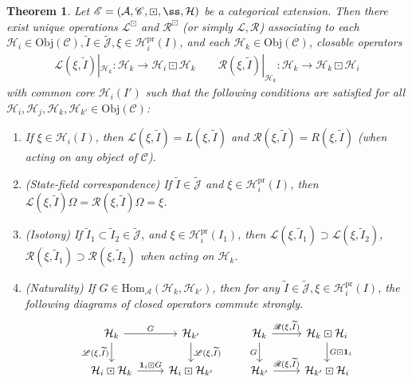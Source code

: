 \documentclass[11pt,b5paper,notitlepage]{article}
\theoremstyle{definition}
\theoremstyle{plain}
\newtheorem{thm}[df]{Theorem}
\newcommand{\mc}{\mathcal}
\newcommand{\wtd}{\widetilde}
\newcommand{\idt}{\mathbf{1}}
\newcommand{\Hom}{\mathrm{Hom}}
\newcommand{\scr}{\mathscr}
\newcommand{\Jtd}{\widetilde{\mathcal J}}
\newcommand{\pr}{\mathrm {pr}}
\newcommand{\Obj}{\mathrm{Obj}}
\numberwithin{equation}{section}
\begin{document}
\begin{thm}\label{lb7}
Let $\scr E=(\mc A,\scr C,\boxdot,\ss,\mc H)$ be a categorical extension. Then there exist unique operations $\scr L^\boxdot$ and $\scr R^\boxdot$ (or simply $\scr L,\scr R$) associating to each $\mc H_i\in\Obj(\scr C),\wtd I\in\Jtd,\xi\in\mc H_i^\pr(I)$, and each $\mc H_k\in\Obj(\scr C)$, closable operators
\begin{gather*}
\scr L(\xi,\wtd I)|_{\mc H_k}:\mc H_k\rightarrow\mc H_i\boxdot\mc H_k \qquad \scr R(\xi,\wtd I)|_{\mc H_k}:\mc H_k\rightarrow\mc H_k\boxdot\mc H_i
\end{gather*}
with common core $\mc H_i(I')$ such that the following conditions are satisfied for all $\mc H_i,\mc H_j,\mc H_k,\mc H_{k'}\in\Obj(\scr C)$:
\begin{enumerate}[label=(\alph*)]
\item If $\xi\in\mc H_i(I)$, then $\scr L(\xi,\wtd I)=L(\xi,\wtd I)$ and $\scr R(\xi,\wtd I)=R(\xi,\wtd I)$ (when acting on any object of $\scr C$).
\item (State-field correspondence) If $\wtd I\in\Jtd$ and $\xi\in\mc H_i^\pr(I)$, then $\scr L(\xi,\wtd I)\Omega=\scr R(\xi,\wtd I)\Omega=\xi$.
\item (Isotony)  If $\wtd I_1\subset\wtd I_2\in\Jtd$, and $\xi\in\mc H_i^\pr(I_1)$, then $\scr L(\xi,\wtd I_1)\supset \scr L(\xi,\wtd I_2)$, $\scr R(\xi,\wtd I_1)\supset \scr R(\xi,\wtd I_2)$ when acting on   $\mc H_k$.
	
\item (Naturality) If $G\in\Hom_{\mc A}(\mc H_k,\mc H_{k'})$, then for any $\wtd I\in\Jtd,\xi\in\mc H_i^\pr(I)$, the following diagrams of closed operators commute strongly.
\begin{equation*}
\begin{tikzcd}
\mc H_k \arrow[d,"{\scr L(\xi,\wtd I)}"'] \arrow[r,"G"] & \mc H_{k'} \arrow[d,"{\scr L(\xi,\wtd I)}"] \\
\mc H_i\boxdot\mc H_k \arrow[r,"\idt_i\boxdot G"]           & \mc H_i\boxdot\mc H_{k'}          
\end{tikzcd}
\qquad
\begin{tikzcd}
\mc H_k \arrow[r,"{\scr R(\xi,\wtd I)}"] \arrow[d,"G"'] & \mc H_k\boxdot\mc H_i \arrow[d,"G\boxdot\idt_i"] \\
\mc H_{k'} \arrow[r,"{\scr R(\xi,\wtd I)}"]           & \mc H_{k'}\boxdot\mc H_i        
\end{tikzcd}
\end{equation*}


\end{enumerate}
\end{thm}
\end{document}
